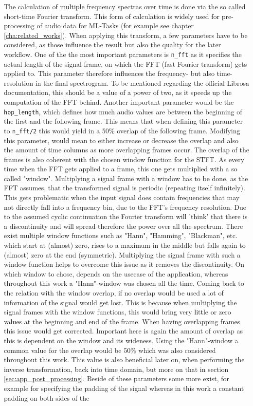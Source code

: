 The calculation of multiple frequency spectras over time is done via the so called short-time Fourier transform. This form of calculation is widely used for pre-processing of audio data for ML-Tasks (for example see chapter \ref{cha:related_works}). When applying this transform, a few parameters have to be considered, as those influence the result but also the quality for the later workflow. One of the the most important parameters is \texttt{n\_fft} as it specifies the actual length of the signal-frame, on which the FFT (fast Fourier transform) gets applied to. This parameter therefore influences the frequency- but also time-resolution in the final spectrogram. To be mentioned regarding the official Librosa documentation, this should be a value of a power of two, as it speeds up the computation of the FFT behind. Another important parameter would be the \texttt{hop\_length}, which defines how much audio values are between the beginning of the first and the following frame. This means that when defining this parameter to \texttt{n\_fft/2} this would yield in a 50\% overlap of the following frame. Modifying this parameter, would mean to either increase or decrease the overlap and also the amount of time columns as more overlapping frames occur. The overlap of the frames is also coherent with the chosen window function for the STFT. As every time when the FFT gets applied to a frame, this one gets multiplied with a so called "window". Multiplying a signal frame with a window has to be done, as the FFT assumes, that the transformed signal is periodic (repeating itself infinitely). \cite{heinzel2002spectrum} This gets problematic when the input signal does contain frequencies that may not directly fall into a frequency bin, due to the FFT's frequency resolution. Due to the assumed cyclic continuation the Fourier transform will 'think' that there is a discontinuity and will spread therefore the power over all the spectrum. There exist multiple window functions such as "Hann", "Hamming", "Blackman", etc. which start at (almost) zero, rises to a maximum in the middle but falls again to (almost) zero at the end (symmetric). Multiplying the signal frame with such a window function helps to overcome this issue as it removes the discontinuity. On which window to chose, depends on the usecase of the application, whereas throughout this work a "Hann"-window was chosen all the time. Coming back to the relation with the window overlap, if no overlap would be used a lot of information of the signal would get lost. This is because when multiplying the signal frames with the window functions, this would bring very little or zero values at the beginning and end of the frame. \cite{heinzel2002spectrum} When having overlapping frames this issue would get corrected. Important here is again the amount of overlap as this is dependent on the window and its wideness. Using the "Hann"-window a common value for the overlap would be 50\% which was also considered throughout this work. This value is also beneficial later on, when performing the inverse transformation, back into time domain, but more on that in section \ref{sec:app_post_processing}. Beside of these parameters some more exist, for example for specifying the padding of the signal whereas in this work a constant padding on both sides of the 